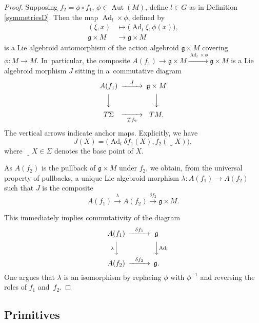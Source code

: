 \documentclass[11pt]{article}
\numberwithin{equation}{section}
\numberwithin{equation}{section}
\DeclareMathOperator{\Adjoint}{Ad}
\DeclareMathOperator{\automorphism}{Aut}
\begin{document}
\begin{proof} Supposing $f_2 = \phi \circ f_1$, $\phi \in
\automorphism(M)$, define $l \in G$ as in Definition
\ref{symmetriesD}. Then the map $\Adjoint_l \times \phi $, defined by
 \begin{align*}
 (\xi,x) &\mapsto \big(\!\Adjoint_l \xi , \phi(x)\big),
 \\
{\mathfrak g} \times M &\rightarrow {\mathfrak g} \times M
 \end{align*}
 is a Lie algebroid automorphism of the action
algebroid ${\mathfrak g} \times M$ covering $\phi \colon M \rightarrow
M$. In~particular, the composite $A(f_1) \rightarrow {\mathfrak g}
\times M \xrightarrow{\Adjoint_l \times \phi} {\mathfrak g} \times M$
is a Lie algebroid morphism $J$ sitting in a~com\-mutative diagram
\begin{equation*}
 \begin{CD}
 A(f_1) @>{J}>> {\mathfrak g} \times M \\ @VVV @VVV \\
T \Sigma @>>{Tf_2}> TM.
 \end{CD}
\end{equation*}
The vertical arrows indicate anchor maps. Explicitly, we have
\[
J(X) = \big(\!\Adjoint_l \delta f_1 (X), f_2(\lrcorner X)\big),
\]
where $\lrcorner X \in \Sigma$ denotes the base point of $X$.

As $A(f_2)$ is the pullback of ${\mathfrak g} \times M$ under $f_2$,
we obtain, from the universal property of pullbacks, a unique Lie
algebroid morphism $\lambda \colon A(f_1) \rightarrow A(f_2)$ such
that $J $ is the composite
 \[
 A(f_1) \xrightarrow{\lambda} A(f_2) \xrightarrow{\delta f_2}
 {\mathfrak g} \times M.
 \]

This immediately implies commutativity of the diagram
\begin{equation*}
 \begin{CD} A(f_1) @>{\delta f_1}>> {\mathfrak g} \\
@V{\lambda}VV @VV{\Adjoint_l}V \\ A(f_2) @>{\delta f_2}>> {\mathfrak g}.
 \end{CD}
\end{equation*}
One argues that $\lambda$ is an isomorphism by
replacing $\phi $ with $\phi^{-1}$ and reversing the roles of $f_1$
and~$f_2$.
\end{proof}

\subsection*{Primitives}
\end{document}

